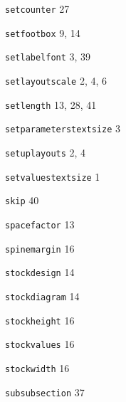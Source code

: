\documentclass[11pt]{article}
\providecommand{\indexfill}{}
\providecommand{\alphaindexspace}[1]{\indexspace{\bfseries #1}}
\begin{document}
\begin{theindex}
\alphaindexspace{S}


\item \texttt  {\bs setcounter}  \indexfill
   27
\item \texttt  {\bs setfootbox}  \indexfill
   9, 14
\item \texttt  {\bs setlabelfont}  \indexfill
   3, 39
\item \texttt  {\bs setlayoutscale}  \indexfill
   2, 4, 6
\item \texttt  {\bs setlength}  \indexfill
   13, 28, 41
\item \texttt  {\bs setparameterstextsize}  \indexfill
   3
\item \texttt  {\bs setuplayouts}  \indexfill
   2, 4
\item \texttt  {\bs setvaluestextsize}  \indexfill
   1
\item \texttt  {\bs skip}  \indexfill
   40
\item \texttt  {\bs spacefactor}  \indexfill
   13
\item \texttt  {\bs spinemargin}  \indexfill
   16
\item \texttt  {\bs stockdesign}  \indexfill
   14
\item \texttt  {\bs stockdiagram}  \indexfill
   14
\item \texttt  {\bs stockheight}  \indexfill
   16
\item \texttt  {\bs stockvalues}  \indexfill
   16
\item \texttt  {\bs stockwidth}  \indexfill
   16
\item \texttt  {\bs subsubsection}  \indexfill
   37

\alphaindexspace{T}



\end{theindex}
\end{document}
